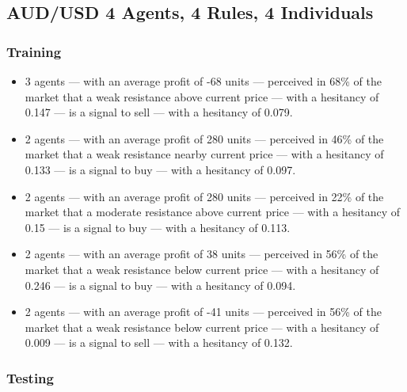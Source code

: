 \subsection{AUD/USD 4 Agents, 4 Rules, 4 Individuals}
\label{}

\subsubsection{Training}
\label{}

{\small
  \begin{itemize}
  \item 3 agents — with an average profit of -68 units — perceived in 68\% of
    the market that a weak resistance above current price — with a hesitancy of
    0.147 — is a signal to sell — with a hesitancy of 0.079.
  \item 2 agents — with an average profit of 280 units — perceived in 46\% of
    the market that a weak resistance nearby current price — with a hesitancy of
    0.133 — is a signal to buy — with a hesitancy of 0.097.
  \item 2 agents — with an average profit of 280 units — perceived in 22\% of
    the market that a moderate resistance above current price — with a hesitancy
    of 0.15 — is a signal to buy — with a hesitancy of 0.113.
  \item 2 agents — with an average profit of 38 units — perceived in 56\% of the
    market that a weak resistance below current price — with a hesitancy of
    0.246 — is a signal to buy — with a hesitancy of 0.094.
  \item 2 agents — with an average profit of -41 units — perceived in 56\% of
    the market that a weak resistance below current price — with a hesitancy of
    0.009 — is a signal to sell — with a hesitancy of 0.132.
  \end{itemize}
}

\subsubsection{Testing}
\label{}

